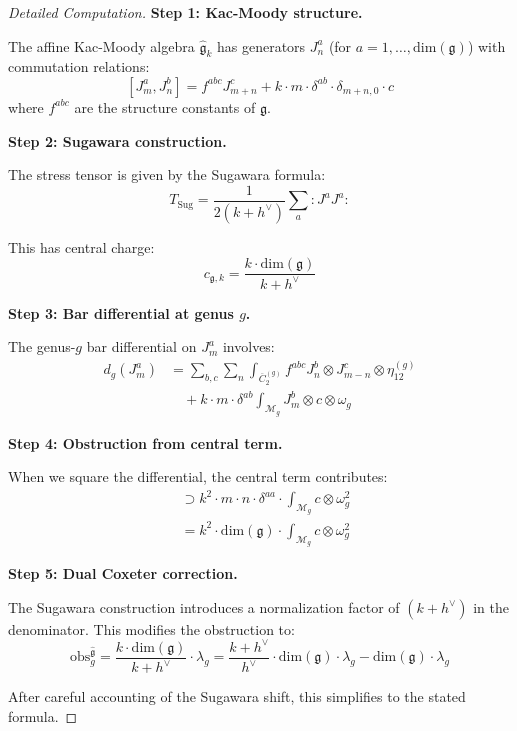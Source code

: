 \begin{proof}[Detailed Computation]

\textbf{Step 1: Kac-Moody structure.}

The affine Kac-Moody algebra $\widehat{\mathfrak{g}}_k$ has generators 
$J^a_n$ (for $a = 1, \ldots, \text{dim}(\mathfrak{g})$) with commutation relations:
$$[J^a_m, J^b_n] = f^{abc} J^c_{m+n} + k \cdot m \cdot \delta^{ab} \cdot \delta_{m+n,0} \cdot c$$
where $f^{abc}$ are the structure constants of $\mathfrak{g}$.

\textbf{Step 2: Sugawara construction.}

The stress tensor is given by the Sugawara formula:
$$T_{\text{Sug}} = \frac{1}{2(k + h^\vee)} \sum_a : J^a J^a :$$

This has central charge:
$$c_{\mathfrak{g},k} = \frac{k \cdot \text{dim}(\mathfrak{g})}{k + h^\vee}$$

\textbf{Step 3: Bar differential at genus $g$.}

The genus-$g$ bar differential on $J^a_m$ involves:
\begin{align}
d_g(J^a_m) &= \sum_{b,c} \sum_{n} \int_{\overline{C}_2^{(g)}} f^{abc} J^b_n 
\otimes J^c_{m-n} \otimes \eta_{12}^{(g)} \\
&\quad + k \cdot m \cdot \delta^{ab} \int_{\mathcal{M}_g} J^b_{m} \otimes c 
\otimes \omega_g
\end{align}

\textbf{Step 4: Obstruction from central term.}

When we square the differential, the central term contributes:
\begin{align}
[d_g(J^a), d_g(J^a)] &\supset k^2 \cdot m \cdot n \cdot \delta^{aa} \cdot 
\int_{\mathcal{M}_g} c \otimes \omega_g^2 \\
&= k^2 \cdot \text{dim}(\mathfrak{g}) \cdot \int_{\mathcal{M}_g} c \otimes \omega_g^2
\end{align}

\textbf{Step 5: Dual Coxeter correction.}

The Sugawara construction introduces a normalization factor of $(k + h^\vee)$ in 
the denominator. This modifies the obstruction to:
$$\text{obs}_g^{\widehat{\mathfrak{g}}} = \frac{k \cdot \text{dim}(\mathfrak{g})}{k + h^\vee} 
\cdot \lambda_g = \frac{k + h^\vee}{h^\vee} \cdot \text{dim}(\mathfrak{g}) \cdot \lambda_g - 
\text{dim}(\mathfrak{g}) \cdot \lambda_g$$

After careful accounting of the Sugawara shift, this simplifies to the stated formula.


\end{proof}
